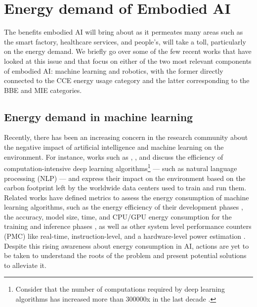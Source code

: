 \section{Energy demand of Embodied AI}\label{sec:energy_demand_embodied_ai}
The benefits embodied AI will bring about as it permeates many areas such as the smart factory, healthcare services, and people's, will take a toll, particularly on the energy demand. We briefly go over some of the few recent works that have looked at this issue and that focus on either of the two most relevant components of embodied AI: machine learning and robotics, with the former directly connected to the CCE energy usage category and the latter corresponding to the BBE and MIE categories.

\subsection{Energy demand in machine learning}
Recently, there has been an increasing concern in the research community about the negative impact of artificial intelligence and machine learning on the environment. For instance, works such as \cite{schwartz2019green}, \cite{vinuesa2020role}, and \cite{Strubell2019EnergyAP} discuss the efficiency of computation-intensive deep learning algorithms\footnote{Consider that the number of computations required by deep learning algorithms has increased more than 300000x in the last decade \cite{schwartz2019green}.} --- such as natural language processing (NLP) --- and express their impact on the environment based on the carbon footprint left by the worldwide data centers used to train and run them. Related works have defined metrics to assess the energy consumption of machine learning algorithms, such as the energy efficiency of their development phases \cite{zhou2020hulk},  the accuracy, model size, time, and CPU/GPU energy consumption for the training and inference phases \cite{Dalgren2019GreenMLA}, as well as other system level performance counters (PMC) like real-time, instruction-level, and a hardware-level power estimation \cite{garcia2019estimation}. Despite this rising awareness about energy consumption in AI, actions are yet to be taken to understand the roots of the problem and present potential solutions to alleviate it.

